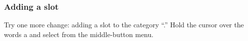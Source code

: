 \documentclass[letterpaper,10pt,english]{sphinxmanual}
\begin{document}
\subsubsection{Adding a slot}
\label{howtoprg:adding-a-slot}
Try one more change: adding a slot to the category “.” Hold the cursor
over the words a  and select  from the middle-button menu.
\begin{figure}[htbp]\begin{flushleft}

\end{flushleft}\end{figure}
\end{document}
